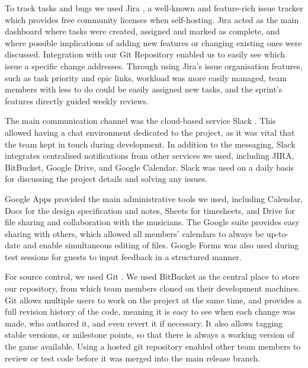 \documentclass[a4paper,11pt]{article}
\begin{document}
To track tasks and bugs we used Jira \cite{jira}, a well-known and feature-rich issue tracker which provides free community licenses when self-hosting. Jira acted as the main dashboard where tasks were created, assigned and marked as complete, and where possible implications of adding new features or changing existing ones were discussed. Integration with our Git Repository enabled us to easily see which issue a specific change addresses. Through using Jira’s issue organisation features, such as task priority and epic links, workload was more easily managed, team members with less to do could be easily assigned new tasks, and the sprint’s features directly guided weekly reviews.

The main communication channel was the cloud-based service Slack \cite{slack}. This allowed having a chat environment dedicated to the project, as it was vital that the team kept in touch during development. In addition to the messaging, Slack integrates centralised notifications from other services we used, including JIRA, BitBucket, Google Drive, and Google Calendar. Slack was used on a daily basis for discussing the project details and solving any issues.

Google Apps \cite{google_apps} provided the main administrative tools we used, including Calendar, Docs for the design specification and notes, Sheets for timesheets, and Drive for file sharing and collaboration with the musicians. The Google suite provides easy sharing with others, which allowed all members’ calendars to always be up-to-date and enable simultaneous editing of files. Google Forms was also used during test sessions for guests to input feedback in a structured manner.

For source control, we used Git \cite{git}. We used BitBucket \cite{bitbucket} as the central place to store our repository, from which team members cloned on their development machines. Git allows multiple users to work on the project at the same time, and provides a full revision history of the code, meaning it is easy to see when each change was made, who authored it, and even revert it if necessary. It also allows tagging stable versions, or milestone points, so that there is always a working version of the game available. Using a hosted git repository enabled other team members to review or test code before it was merged into the main release branch.
\end{document}
